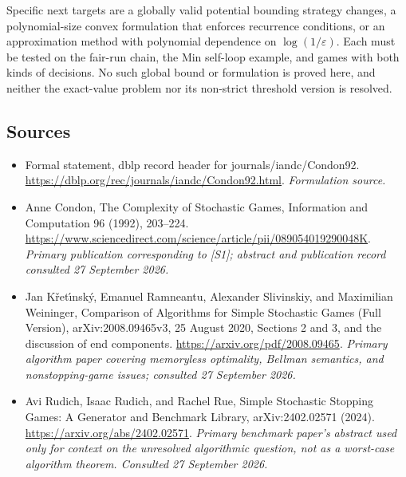 \documentclass[11pt]{article}
\begin{document}
Specific next targets are a globally valid potential bounding strategy
changes, a polynomial-size convex formulation that enforces recurrence
conditions, or an approximation method with polynomial dependence on
$\log(1/\varepsilon)$. Each must be tested on the fair-run chain,
the Min self-loop example, and games with both kinds of decisions.
No such global bound or formulation is proved here, and neither the
exact-value problem nor its non-strict threshold version is resolved.

\subsection{Sources}
\begin{itemize}
\item[S1]Formal statement, dblp record header for journals/iandc/Condon92.
\url{https://dblp.org/rec/journals/iandc/Condon92.html}.
\textit{Formulation source.}
\item[E1]Anne Condon, The Complexity of Stochastic Games,
Information and Computation 96 (1992), 203--224.
\url{https://www.sciencedirect.com/science/article/pii/089054019290048K}.
\textit{Primary publication corresponding to [S1]; abstract and publication
record consulted 27 September 2026.}
\item[E2]Jan K\v{r}et\'{\i}nsk\'y, Emanuel Ramneantu, Alexander Slivinskiy,
and Maximilian Weininger, Comparison of Algorithms for Simple Stochastic
Games (Full Version), arXiv:2008.09465v3, 25 August 2020,
Sections 2 and 3, and the discussion of end components.
\url{https://arxiv.org/pdf/2008.09465}.
\textit{Primary algorithm paper covering memoryless optimality, Bellman
semantics, and nonstopping-game issues; consulted 27 September 2026.}
\item[E3]Avi Rudich, Isaac Rudich, and Rachel Rue, Simple Stochastic
Stopping Games: A Generator and Benchmark Library,
arXiv:2402.02571 (2024).
\url{https://arxiv.org/abs/2402.02571}.
\textit{Primary benchmark paper's abstract used only for context on the
unresolved algorithmic question, not as a worst-case algorithm theorem.
Consulted 27 September 2026.}
\end{itemize}
\end{document}
